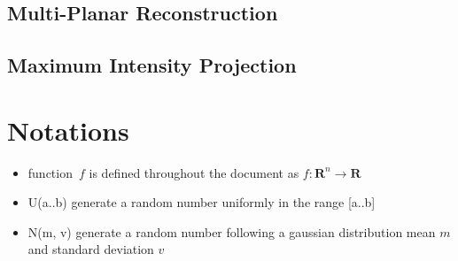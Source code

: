 \documentclass[11pt]{article}
\begin{document}
\subsection{Multi-Planar Reconstruction}
\subsection{Maximum Intensity Projection}

\section{Notations}
\begin{itemize}
\item function~$f$ is defined throughout the document as $f \colon \textbf{R}^n \to \textbf{R}$
\item U(a..b) generate a random number uniformly in the range [a..b]
\item N(m, v) generate a random number following a gaussian distribution mean $m$ and standard deviation $v$
\end{itemize}



\end{document}
